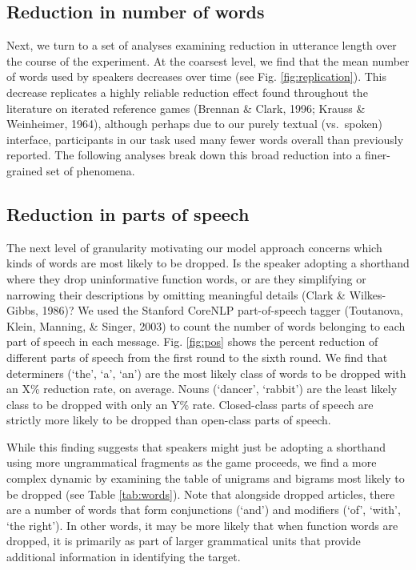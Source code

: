 \documentclass[alpha-refs]{wiley-article}
\begin{document}
\subsection{Reduction in number of words}\label{reduction}

Next, we turn to a set of analyses examining reduction in utterance
length over the course of the experiment. At the coarsest level, we find
that the mean number of words used by speakers decreases over time (see
Fig. \ref{fig:replication}). This decrease replicates a highly reliable
reduction effect found throughout the literature on iterated reference
games (Brennan \& Clark, 1996; Krauss \& Weinheimer, 1964), although
perhaps due to our purely textual (vs.~spoken) interface, participants
in our task used many fewer words overall than previously reported. The
following analyses break down this broad reduction into a finer-grained
set of phenomena.

\subsection{Reduction in parts of speech}
The next level of granularity motivating our model approach concerns
which kinds of words are most likely to be dropped. Is the speaker
adopting a shorthand where they drop uninformative function words, or
are they simplifying or narrowing their descriptions by omitting
meaningful details (Clark \& Wilkes-Gibbs, 1986)? We used the Stanford
CoreNLP part-of-speech tagger (Toutanova, Klein, Manning, \& Singer,
2003) to count the number of words belonging to each part of speech in
each message. Fig. \ref{fig:pos} shows the percent reduction of
different parts of speech from the first round to the sixth round. We
find that determiners (`the', `a', `an') are the most likely class of
words to be dropped with an X\% reduction rate, on average. Nouns
(`dancer', `rabbit') are the least likely class to be dropped with only
an Y\% rate. Closed-class parts of speech are strictly more likely to be
dropped than open-class parts of speech.

While this finding suggests that speakers might just be adopting a
shorthand using more ungrammatical fragments as the game proceeds, we
find a more complex dynamic by examining the table of unigrams and
bigrams most likely to be dropped (see Table \ref{tab:words}). Note that
alongside dropped articles, there are a number of words that form
conjunctions (`and') and modifiers (`of', `with', `the right'). In other
words, it may be more likely that when function words are dropped, it is
primarily as part of larger grammatical units that provide additional
information in identifying the target.
\end{document}
